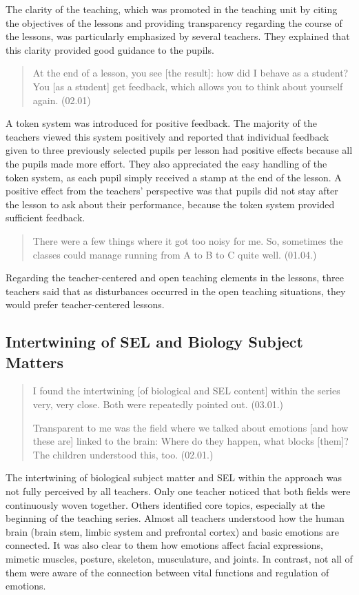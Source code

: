 \documentclass[11.5pt]{sig-alternate} %
\begin{document}
\begin{large}
The clarity of the teaching, which was promoted in the teaching unit by citing the objectives of the lessons and providing transparency regarding the course of the lessons, was particularly emphasized by several teachers. They explained that this clarity provided good guidance to the pupils.

\begin{quote}
    At the end of a lesson, you see [the result]: how did I behave as a student? You [as a student] get feedback, which allows you to think about yourself again. (02.01)
\end{quote}

A token system was introduced for positive feedback. The majority of the teachers viewed this system positively and reported that individual feedback given to three previously selected pupils per lesson had positive effects because all the pupils made more effort. They also appreciated the easy handling of the token system, as each pupil simply received a stamp at the end of the lesson. A positive effect from the teachers’ perspective was that pupils did not stay after the lesson to ask about their performance, because the token system provided sufficient feedback.

\begin{quote}
    There were a few things where it got too noisy for me. So, sometimes the classes could manage running from A to B to C quite well. (01.04.)
\end{quote}

Regarding the teacher-centered and open teaching elements in the lessons, three teachers said that as disturbances occurred in the open teaching situations, they would prefer teacher-centered lessons.

\subsection*{Intertwining of SEL and Biology Subject Matters}

\begin{quote}
    I found the intertwining [of biological and SEL content] within the series very, very close. Both were repeatedly pointed out. (03.01.)
    
    Transparent to me was the field where we talked about emotions [and how these are] linked to the brain: Where do they happen, what blocks [them]? The children understood this, too. (02.01.)
\end{quote}

The intertwining of biological subject matter and SEL within the approach was not fully perceived by all teachers. Only one teacher noticed that both fields were continuously woven together. Others identified core topics, especially at the beginning of the teaching series. Almost all teachers understood how the human brain (brain stem, limbic system and prefrontal cortex) and basic emotions are connected. It was also clear to them how emotions affect facial expressions, mimetic muscles, posture, skeleton, musculature, and joints. In contrast, not all of them were aware of the connection between vital functions and regulation of emotions.


\end{large}
\end{document}

